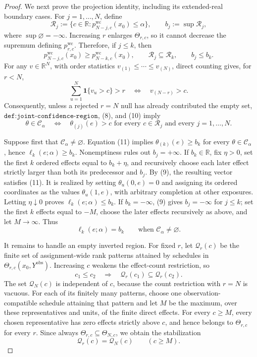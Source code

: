 \documentclass{article}
\begin{document}
\begin{proof}
We next prove the projection identity, including its extended-real boundary cases.  For \(j=1,\ldots,N\), define
\[
 \mathcal R_j
 :=\{c\in\mathbb R:p^{\mathrm{wc}}_{N-j,c}(x_0)\leq\alpha\},
 \qquad b_j:=\sup\mathcal R_j,
\tag{8}
\]
where \(\sup\varnothing=-\infty\).  Increasing \(r\) enlarges \(\Theta_{r,c}\), so it cannot decrease the supremum defining \(p^{\mathrm{wc}}_{r,c}\).  Therefore, if \(j\leq k\), then
\[
 p^{\mathrm{wc}}_{N-j,c}(x_0)
 \geq p^{\mathrm{wc}}_{N-k,c}(x_0),
 \qquad \mathcal R_j\subseteq\mathcal R_k,
 \qquad b_j\leq b_k.
\tag{9}
\]
For any \(v\in\mathbb R^N\), with order statistics \(v_{(1)}\leq\cdots\leq v_{(N)}\), direct counting gives, for \(r<N\),
\[
 \sum_{u=1}^N\mathbf 1\{v_u>c\}>r
 \quad\Longleftrightarrow\quad
 v_{(N-r)}>c.
\tag{10}
\]
Consequently, unless a rejected \(r=N\) null has already contributed the empty set, \(\texttt{def:joint-confidence-region}\), (8), and (10) imply
\[
 \theta\in\mathcal C_\alpha
 \quad\Longleftrightarrow\quad
 \theta_{(j)}(e)>c
 \text{ for every }c\in\mathcal R_j
 \text{ and every }j=1,\ldots,N.
\tag{11}
\]

Suppose first that \(\mathcal C_\alpha\neq\varnothing\).  Equation (11) implies \(\theta_{(k)}(e)\geq b_k\) for every \(\theta\in\mathcal C_\alpha\), hence \(\ell_k(e;\alpha)\geq b_k\).  Nonemptiness rules out \(b_j=+\infty\).  If \(b_k\in\mathbb R\), fix \(\eta>0\), set the first \(k\) ordered effects equal to \(b_k+\eta\), and recursively choose each later effect strictly larger than both its predecessor and \(b_j\).  By (9), the resulting vector satisfies (11).  It is realized by setting \(\theta_u(0,e)=0\) and assigning its ordered coordinates as the values \(\theta_u(1,e)\), with arbitrary completion at other exposures.  Letting \(\eta\downarrow0\) proves \(\ell_k(e;\alpha)\leq b_k\).  If \(b_k=-\infty\), (9) gives \(b_j=-\infty\) for \(j\leq k\); set the first \(k\) effects equal to \(-M\), choose the later effects recursively as above, and let \(M\to\infty\).  Thus
\[
 \ell_k(e;\alpha)=b_k
 \qquad\text{when }\mathcal C_\alpha\neq\varnothing.
\tag{12}
\]

It remains to handle an empty inverted region.  For fixed \(r\), let \(\mathcal Q_r(c)\) be the finite set of assignment-wide rank patterns attained by schedules in \(\Theta_{r,c}(x_0,Y^{\mathrm{obs}})\).  Increasing \(c\) weakens the effect-count restriction, so
\[
 c_1\leq c_2\quad\Longrightarrow\quad
 \mathcal Q_r(c_1)\subseteq\mathcal Q_r(c_2).
\tag{13}
\]
The set \(\mathcal Q_N(c)\) is independent of \(c\), because the count restriction with \(r=N\) is vacuous.  For each of its finitely many patterns, choose one observation-compatible schedule attaining that pattern and let \(M\) be the maximum, over these representatives and units, of the finite direct effects.  For every \(c\geq M\), every chosen representative has zero effects strictly above \(c\), and hence belongs to \(\Theta_{r,c}\) for every \(r\).  Since always \(\Theta_{r,c}\subseteq\Theta_{N,c}\), we obtain the stabilization
\[
 \mathcal Q_r(c)=\mathcal Q_N(c)
 \qquad(c\geq M).
\tag{14}
\]


\end{proof}
\end{document}
